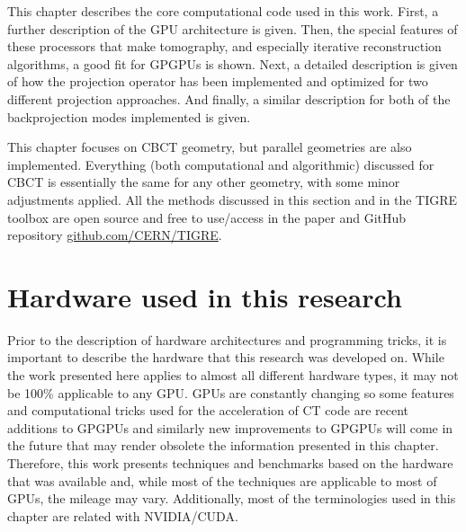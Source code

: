 
This chapter describes the core computational code used in this work. First, a further description of the GPU architecture is given. Then, the special features of these processors that make tomography, and especially iterative reconstruction algorithms, a good fit for GPGPUs is shown. Next, a detailed description is given of how the projection operator has been implemented and optimized for two different projection approaches.  And finally, a similar description for both of the backprojection modes implemented is given.

This chapter focuses on CBCT geometry, but parallel geometries are also implemented. Everything (both computational and algorithmic) discussed for CBCT is essentially the same for any other geometry, with some minor adjustments applied. All the methods discussed in this section and in the TIGRE toolbox are open source and free to use/access in the paper\cite{TIGRE} and GitHub repository \href{https://github.com/CERN/TIGRE}{github.com/CERN/TIGRE}.

\section{Hardware used in this research}
Prior to the description of hardware architectures and programming tricks, it is important to describe the hardware that this research was developed on. While the work presented here applies to almost all different hardware types, it may not be 100\% applicable to any GPU. GPUs are constantly changing so some features and computational tricks used for the acceleration of CT code are recent additions to GPGPUs and similarly new improvements to GPGPUs will come in the future that may render obsolete the information presented in this chapter. Therefore, this work presents techniques and benchmarks based on the hardware that was available and, while most of the techniques are applicable to most of GPUs, the mileage may vary. Additionally, most of the terminologies used in this chapter are related with NVIDIA/CUDA.

